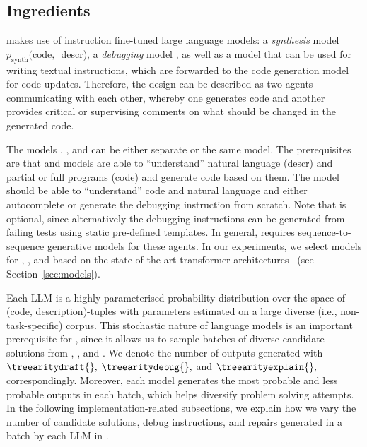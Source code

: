 \subsection{Ingredients}
\label{sec:ingredients}

\method{} makes use of instruction fine-tuned large language models: a \emph{synthesis} model $p_{\text{synth}}(\text{code, }$ descr), a \emph{debugging} model \debugmodel{}, as well as a model \textmodel{} that can be used for writing textual instructions, which are forwarded to the code generation model \debugmodelnoargs{} for code updates. 
Therefore, the design can be described as two agents communicating with each other, whereby one generates code and another provides critical or supervising comments on what should be changed in the generated code. 

The models \synthmodelnoargs{}, \debugmodelnoargs{}, and \textmodelnoargs{} can be either separate or the same model.
The prerequisites are that \synthmodelnoargs{} and \debugmodelnoargs{} models are able to ``understand'' natural language (descr) and partial or full programs (code) and generate code based on them. 
The model \textmodelnoargs{}{} should be able to ``understand'' code and natural language and either autocomplete or generate the debugging instruction from scratch. 
Note that \textmodelnoargs{} is optional, since alternatively the debugging instructions can be generated from failing tests using static pre-defined templates.
In general, \method{} requires sequence-to-sequence generative models for these agents. 
In our experiments, we select models for \synthmodelnoargs{}, \debugmodelnoargs{}, and \textmodelnoargs{} based on the state-of-the-art transformer architectures~\cite{vaswani2017:attention} 
(see Section~\ref{sec:models}). 

Each LLM is a highly parameterised probability distribution over the space of (code, description)-tuples with parameters estimated on a large diverse (i.e., non-task-specific) corpus.
This stochastic nature of language models is an important prerequisite for \method{}, since it allows us to sample batches of diverse candidate solutions from \synthmodelnoargs{}, \debugmodelnoargs{}, and \textmodelnoargs{}. 
We denote the number of outputs generated with $\treearitydraft{},$ $\treearitydebug{},$ and $\treearityexplain{},$ correspondingly.
Moreover, each model generates the most probable and less probable outputs in each batch, which helps diversify problem solving attempts. 
In the following implementation-related subsections, we explain how we vary the number of candidate solutions, debug instructions, and repairs generated in a batch by each LLM in \method{}.

